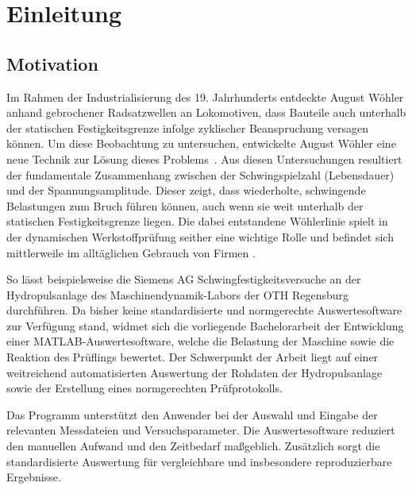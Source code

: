 %
\chapter{Einleitung}%
    \section{Motivation} %
 Im Rahmen der Industrialisierung des 19. Jahrhunderts entdeckte August Wöhler anhand gebrochener Radsatzwellen an Lokomotiven, dass Bauteile auch unterhalb der statischen Festigkeitsgrenze infolge zyklischer Beanspruchung versagen können. 
 Um diese Beobachtung zu untersuchen, entwickelte August Wöhler eine neue Technik zur Lösung dieses Problems~\cite[Seite~261]{Werkstofftechnik-Praktikum2021}. 
Aus diesen Untersuchungen resultiert der fundamentale Zusammenhang zwischen der Schwingspielzahl (Lebensdauer) und der Spannungsamplitude. Dieser zeigt, dass wiederholte, schwingende Belastungen zum Bruch führen können, auch wenn sie weit unterhalb der statischen Festigkeitsgrenze liegen. Die dabei entstandene Wöhlerlinie spielt in der dynamischen Werkstoffprüfung seither eine wichtige Rolle und befindet sich mittlerweile im alltäglichen Gebrauch von Firmen \cite[Seite 18--19]{Ermüdungsfestigkeit2007}.

So lässt beispielsweise die Siemens AG Schwingfestigkeitsversuche an der Hydropulsanlage des Maschinendynamik-Labors der OTH Regensburg durchführen. Da bisher keine standardisierte und normgerechte Auswertesoftware zur Verfügung stand, widmet sich die vorliegende Bachelorarbeit der Entwicklung einer MATLAB-Auswertesoftware, welche die Belastung der Maschine sowie die Reaktion des Prüflings bewertet. Der Schwerpunkt der Arbeit liegt auf einer weitreichend automatisierten Auswertung der Rohdaten der Hydropulsanlage sowie der Erstellung eines normgerechten Prüfprotokolls.

 Das Programm unterstützt den Anwender bei der Auswahl und Eingabe der relevanten Messdateien und Versuchsparameter. Die Auswertesoftware reduziert den manuellen Aufwand und den Zeitbedarf maßgeblich. Zusätzlich sorgt die standardisierte Auswertung für vergleichbare und insbesondere reproduzierbare Ergebnisse. 

